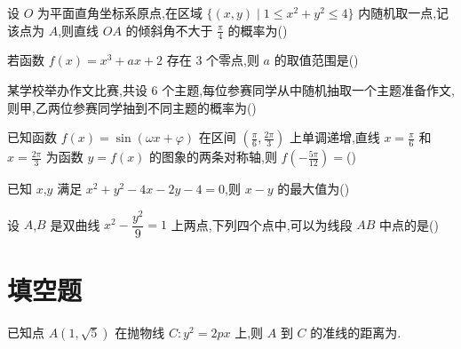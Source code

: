 \begin{problem}
设 \(O\) 为平面直角坐标系原点,在区域 \(\{(x,y)\mid1\le x^2+y^2\le4\}\) 内随机取一点,记该点为 \(A\),则直线 \(OA\) 的倾斜角不大于 \(\frac\pi4\) 的概率为(\quad)

\end{problem}

\begin{problem}
若函数 \(f(x)=x^3+ax+2\) 存在 \(3\) 个零点,则 \(a\) 的取值范围是(\quad)

\end{problem}

\begin{problem}
某学校举办作文比赛,共设 \(6\) 个主题,每位参赛同学从中随机抽取一个主题准备作文,则甲,乙两位参赛同学抽到不同主题的概率为(\quad)

\end{problem}

\begin{problem}
已知函数 \(f(x)=\sin(\omega x+\varphi)\) 在区间 \(\left(\frac\pi6,\frac{2\pi}3\right)\) 上单调递增,直线 \(x=\frac\pi6\) 和 \(x=\frac{2\pi}3\) 为函数 \(y=f(x)\) 的图象的两条对称轴,则 \(f\left(-\frac{5\pi}{12}\right)=\)(\quad)

\end{problem}

\begin{problem}
已知 \(x\),\(y\) 满足 \(x^2+y^2-4x-2y-4=0\),则 \(x-y\) 的最大值为(\quad)

\end{problem}

\begin{problem}
设 \(A\),\(B\) 是双曲线 \(x^2-\dfrac{y^2}{9}=1\) 上两点,下列四个点中,可以为线段 \(AB\) 中点的是(\quad)

\end{problem}

\section{填空题}

\begin{problem}
已知点 \(A(1,\sqrt5)\) 在抛物线 \(C:y^2=2px\) 上,则 \(A\) 到 \(C\) 的准线的距离为\fillinblank{}.

\end{problem}

